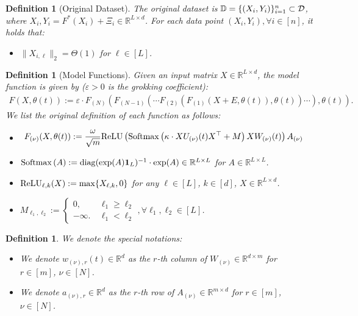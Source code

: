 \documentclass[11pt]{article}
\theoremstyle{plain}
\newtheorem{definition}[theorem]{Definition}
\newcommand{\R}{\mathbb{R}}
\DeclareMathOperator{\diag}{diag}
\begin{document}
\begin{definition}[Original Dataset]\label{def:D}
    The original dataset is $\mathbb{D} = \{ (X_i, Y_i) \}_{i=1}^n \subset {\cal D}$, where $X_i, Y_i = F^*(X_i) + \Xi_i \in \R^{L \times d}$. For each data point $(X_i, Y_i), \forall i \in [n]$, it holds that:
    \begin{itemize}
        \item $\| X_{i, \ell} \|_2 = \Theta(1)$ for $\ell \in [L]$.
    \end{itemize}
\end{definition}

\begin{definition}[Model Functions]
    Given an input matrix $X \in \R^{L \times d}$, the model function is given by ($\varepsilon > 0$ is the grokking coefficient):
    \begin{align*}
        F(X, \theta(t)) := \varepsilon \cdot F_{(N)}(F_{(N-1)}( \cdots F_{(2)}(F_{(1)}(X + E, \theta(t)), \theta(t)) \cdots ), \theta(t)).
    \end{align*}
    We list the original definition of each function as follows:
    \begin{itemize}
        \item 
        \begin{align*}
            & ~ F_{(\nu)}(X, \theta(t))
            :=   \frac{\omega}{\sqrt{m}} {\rm ReLU}\left({\rm Softmax}\left( \kappa \cdot XU_{(\nu)}(t)X^\top + M \right) XW_{(\nu)}(t)\right)A_{(\nu)}
        \end{align*}
        \item ${\rm Softmax}\left( A \right) := \diag(\exp(A){\bf 1}_L)^{-1} \cdot \exp(A)\in \R^{L \times L}$ for $A \in \R^{L \times L}$.
        \item ${\rm ReLU}_{\ell, k}(X) := \max\{X_{\ell, k}, 0\}$ for any $\ell \in [L]$, $k \in [d]$, $X \in \R^{L \times d}$.
        \item $M_{\ell_1, \ell_2} := \begin{cases}
            0, & ~ \ell_1 \ge \ell_2 \\
            -\infty. & ~ \ell_1 < \ell_2 
        \end{cases}, \forall \ell_1, \ell_2 \in [L]$.
    \end{itemize}
\end{definition}

\begin{definition}
    We denote the special notations:
    \begin{itemize}
        \item We denote $w_{(\nu), r}(t) \in \R^d$ as the $r$-th column of $W_{(\nu)} \in \R^{d \times m}$ for $r\in [m]$, $\nu \in [N]$.
        \item We denote $a_{(\nu), r} \in \R^d$ as the $r$-th row of $A_{(\nu)} \in \R^{m \times d}$ for $r\in [m]$, $\nu \in [N]$.
    \end{itemize}
\end{definition}
\end{document}
